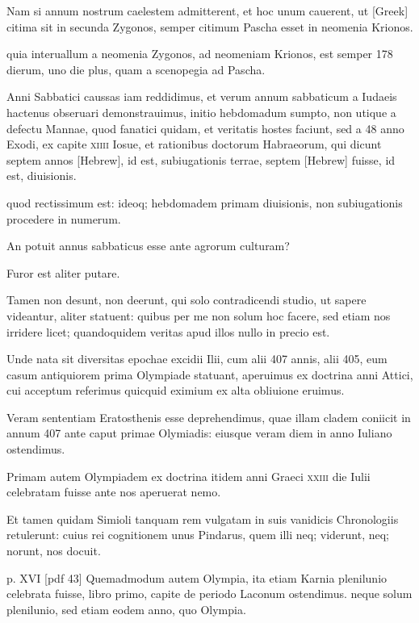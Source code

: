 \begin{parnumbers}
Nam si annum
nostrum caelestem admitterent, et hoc unum cauerent, ut \textgreek{[Greek]}
citima sit in secunda Zygonos, semper citimum Pascha esset in neomenia
Krionos.

quia interuallum a neomenia Zygonos, ad neomeniam
Krionos, est semper 178 dierum, uno die plus, quam a scenopegia
ad Pascha.

Anni Sabbatici caussas iam reddidimus, et verum
annum sabbaticum a Iudaeis hactenus obseruari demonstrauimus,
initio hebdomadum sumpto, non utique a defectu Mannae,
quod fanatici quidam, et veritatis hostes faciunt, sed a 48 anno Exodi,
ex capite \textsc{xiiii} Iosue, et rationibus doctorum Habraeorum, qui
dicunt septem annos \texthebrew{[Hebrew]}, id est, subiugationis terrae,
septem \texthebrew{[Hebrew]}
fuisse, id est, diuisionis.

quod rectissimum est: ideoq; hebdomadem
primam diuisionis, non subiugationis procedere in numerum.

An
potuit annus sabbaticus esse ante agrorum culturam?

Furor est aliter putare.

Tamen non desunt, non deerunt, qui solo contradicendi
studio, ut sapere videantur, aliter statuent: quibus per me non solum
hoc facere, sed etiam nos irridere licet; quandoquidem veritas apud
illos nullo in precio est.

Unde nata sit diversitas epochae excidii Ilii,
cum alii 407 annis, alii 405, eum casum antiquiorem prima Olympiade
statuant, aperuimus ex doctrina anni Attici, cui acceptum
referimus quicquid eximium ex alta obliuione eruimus.

Veram sententiam
Eratosthenis esse deprehendimus, quae illam cladem coniicit
in annum 407 ante caput primae Olymiadis: eiusque veram
diem in anno Iuliano ostendimus.

Primam autem Olympiadem
ex doctrina itidem anni Graeci \textsc{xxiii} die Iulii celebratam fuisse ante
nos aperuerat nemo.

Et tamen quidam Simioli tanquam rem
vulgatam in suis vanidicis Chronologiis retulerunt: cuius rei cognitionem
unus Pindarus, quem illi neq; viderunt, neq; norunt, nos
docuit.


\clearpage
p. XVI [pdf 43]
Quemadmodum autem Olympia, ita etiam Karnia plenilunio
celebrata fuisse, libro primo, capite de periodo Laconum
ostendimus. neque solum plenilunio, sed etiam eodem anno, quo
Olympia.


\end{parnumbers}
